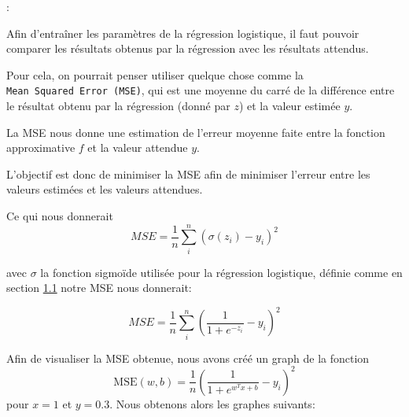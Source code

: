 \documentclass[
]{article}
\begin{document}
:

Afin d'entraîner les paramètres de la régression logistique, il faut
pouvoir comparer les résultats obtenus par la régression avec les
résultats attendus.

Pour cela, on pourrait penser utiliser quelque chose comme la
\texttt{Mean\ Squared\ Error\ (MSE)}, qui est une moyenne du carré de la
différence entre le résultat obtenu par la régression (donné par \(z\))
et la valeur estimée \(y\).

La MSE nous donne une estimation de l'erreur moyenne faite entre la
fonction approximative \(f\) et la valeur attendue \(y\).

L'objectif est donc de minimiser la MSE afin de minimiser l'erreur entre
les valeurs estimées et les valeurs attendues.

Ce qui nous donnerait
\[MSE = \frac{1}{n}\sum_i^n (\sigma(z_i) - y_i)^2\]

avec \(\sigma\) la fonction sigmoïde utilisée pour la régression
logistique, définie comme en section
\href{#ruxe9gression-logistique}{1.1} notre MSE nous donnerait:

\[MSE = \frac{1}{n}\sum_i^n{\left(\frac{1}{1 + e^{-z_i}} - y_i \right)^2}\]

Afin de visualiser la MSE obtenue, nous avons créé un graph de la
fonction \[
\text{MSE}(w, b) = \frac{1}{n} \left( \frac{1}{1+ e^{w^T x + b}} - y_i \right)^2
\] pour \(x = 1\) et \(y = 0.3\). Nous obtenons alors les graphes
suivants:
\end{document}
